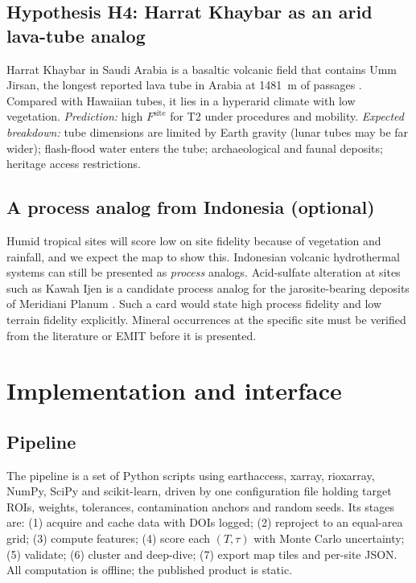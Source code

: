 \documentclass[11pt,a4paper]{article}
\begin{document}
\subsection{Hypothesis H4: Harrat Khaybar as an arid lava-tube analog}
Harrat Khaybar in Saudi Arabia is a basaltic volcanic field that contains Umm Jirsan, the longest reported lava tube in Arabia at 1481~m of passages \citep{harratkhaybar}. Compared with Hawaiian tubes, it lies in a hyperarid climate with low vegetation. \emph{Prediction:} high $F^{\mathrm{site}}$ for T2 under procedures and mobility. \emph{Expected breakdown:} tube dimensions are limited by Earth gravity (lunar tubes may be far wider); flash-flood water enters the tube; archaeological and faunal deposits; heritage access restrictions.

\subsection{A process analog from Indonesia (optional)}
Humid tropical sites will score low on site fidelity because of vegetation and rainfall, and we expect the map to show this. Indonesian volcanic hydrothermal systems can still be presented as \emph{process} analogs. Acid-sulfate alteration at sites such as Kawah Ijen is a candidate process analog for the jarosite-bearing deposits of Meridiani Planum \citep{klingelhofer2004}. Such a card would state high process fidelity and low terrain fidelity explicitly. Mineral occurrences at the specific site must be verified from the literature or EMIT before it is presented.

\section{Implementation and interface}

\subsection{Pipeline}
The pipeline is a set of Python scripts using earthaccess, xarray, rioxarray, NumPy, SciPy and scikit-learn, driven by one configuration file holding target ROIs, weights, tolerances, contamination anchors and random seeds. Its stages are: (1) acquire and cache data with DOIs logged; (2) reproject to an equal-area grid; (3) compute features; (4) score each $(T,\tau)$ with Monte Carlo uncertainty; (5) validate; (6) cluster and deep-dive; (7) export map tiles and per-site JSON. All computation is offline; the published product is static.
\end{document}
